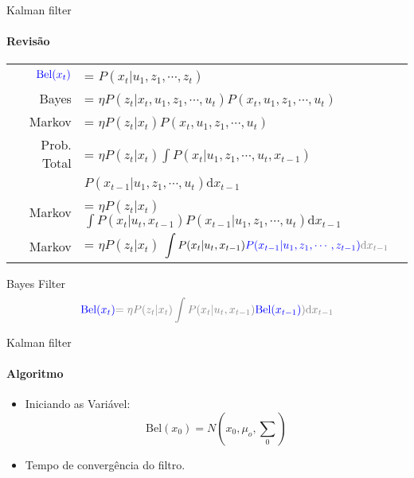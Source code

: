 \documentclass{beamer}
\begin{document}
\begin{frame}{Kalman filter}
    \framesubtitle{Revisão}
    \setlength\extrarowheight{5pt}
        \begin{tabular}{r l}
            $\color{blue}{\text{Bel}}(x_t)$ & = $P(x_t| u_1, z_1,  \cdots, z_t)$ \\
            Bayes & = $\eta P(z_t|x_t,  u_1, z_1,  \cdots,  u_t)P(x_t, u_1, z_1, \cdots, u_t)$ \\
            Markov & = $\eta P(z_t|x_t)P(x_t, u_1, z_1, \cdots, u_t)$ \\
            Prob. Total & = $\eta P(z_t|x_t)\displaystyle\int P(x_t| u_1, z_1, \cdots, u_t,x_{t-1})$ \\
                        &  \quad \quad \quad $P(x_{t-1}| u_1, z_1, \cdots, u_t)\text{d}x_{t-1}$\\
            Markov & = $\eta P(z_t|x_t)$ $\displaystyle\int P(x_t| u_t,x_{t-1})P(x_{t-1}| u_1, z_1, \cdots, u_t)\text{d}x_{t-1}$ \\
            Markov & = $\eta P(z_t|x_t)$ $\displaystyle\int P(x_t| u_t,x_{t-1})\color{blue}{P(x_{t-1}| u_1, z_1, \cdots, z_{t-1}})\color{gray}{\text{d}x_{t-1}}$ \\
        \end{tabular}   
    \begin{block}{Bayes Filter}
        \begin{equation*}
            \color{blue}{\text{Bel}}(x_t)  \color{gray}{=\eta P(z_t|x_t)\displaystyle\int P(x_t| u_t,x_{t-1})}\color{blue}{\color{blue}{\text{Bel}}(x_{t-1})}\color{gray}{)\text{d}x_{t-1}}
        \end{equation*}
    \end{block}
\end{frame}


\begin{frame}[c]{Kalman filter}
    \framesubtitle{Algoritmo}
    \begin{itemize}
        \item Iniciando as Variável:
        \begin{equation}
            \text{Bel}(x_0) = N\left(x_0, \mu_o, {\textstyle\sum} _0\right)
        \end{equation}
        \item Tempo de convergência do filtro.
    \end{itemize}
\end{frame}
\end{document}
